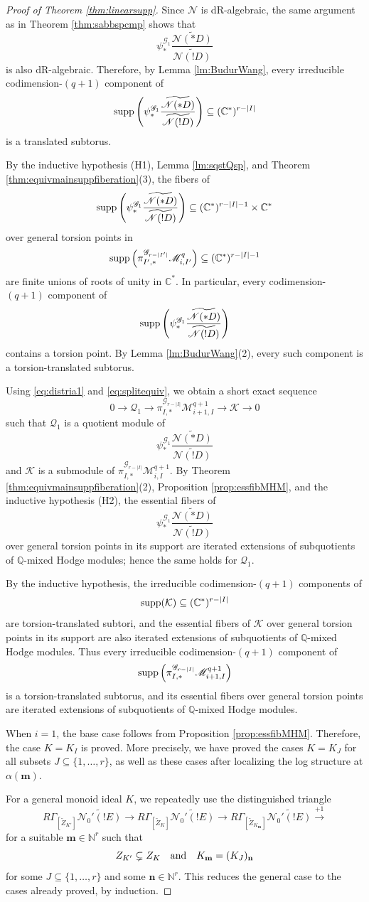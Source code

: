 \documentclass{amsart}
\theoremstyle{plain}
\numberwithin{theorem}{section}
\theoremstyle{definition}
\theoremstyle{remark}
\theoremstyle{definition}
\newcommand{\wt}{\widetilde}
\newcommand{\C}{\mathbb{C}} %
\newcommand{\N}{\mathbb{N}}
\newcommand{\Q}{\mathbb{Q}}
\newcommand{\cK}{\mathcal{K}}
\newcommand{\cN}{\mathcal{N}}
\newcommand{\cQ}{\mathcal{Q}}
\newcommand{\bn}{\mathbf{n}}
\newcommand{\bm}{\mathbf{m}}
\newcommand{\sM}{\mathscr{M}}
\newcommand{\sN}{\mathscr{N}}
\newcommand{\sG}{\mathscr{G}}
\newcommand{\supp}{\textup{supp}}
\begin{document}
\begin{proof}[Proof of Theorem \ref{thm:linearsupp}]
Since $\sN$ is dR-algebraic, the same argument as in
Theorem \ref{thm:sabbspcmp} shows that
\[
\psi_*^{\sG_1}
\frac{\wt{\sN(*D)}}{\wt{\sN(!D)}}
\]
is also dR-algebraic. Therefore, by Lemma \ref{lm:BudurWang}, every
irreducible codimension-$(q+1)$ component of
\[
\supp
\left(
\psi_*^{\sG_1}
\frac{\wt{\sN(*D)}}{\wt{\sN(!D)}}
\right)
\subseteq
(\C^*)^{r-|I|}
\]
is a translated subtorus.

By the inductive hypothesis (H1), Lemma \ref{lm:sqstQsp}, and
Theorem \ref{thm:equivmainsuppfiberation}(3), the fibers of
\[
\supp
\left(
\psi_*^{\sG_1}
\frac{\wt{\sN(*D)}}{\wt{\sN(!D)}}
\right)
\subseteq
(\C^*)^{r-|I|-1}\times\C^*
\]
over general torsion points in
\[
\supp
\left(
\pi_{I',*}^{\sG_{r-|I'|}}\sM^q_{i,I'}
\right)
\subseteq
(\C^*)^{r-|I|-1}
\]
are finite unions of roots of unity in $\C^*$. In particular, every
codimension-$(q+1)$ component of
\[
\supp
\left(
\psi_*^{\sG_1}
\frac{\wt{\sN(*D)}}{\wt{\sN(!D)}}
\right)
\]
contains a torsion point. By Lemma \ref{lm:BudurWang}(2), every such component
is a torsion-translated subtorus.

Using \eqref{eq:distria1} and \eqref{eq:splitequiv}, we obtain a short exact
sequence
\[
0\to
\cQ_1
\to
\pi_{I,*}^{\sG_{r-|I|}}\sM^{q+1}_{i+1,I}
\to
\cK
\to 0
\]
such that $\cQ_1$ is a quotient module of
\[
\psi_*^{\sG_1}
\frac{\wt{\sN(*D)}}{\wt{\sN(!D)}}
\]
and $\cK$ is a submodule of
$\pi_{I,*}^{\sG_{r-|I|}}\sM^{q+1}_{i,I}.$
By Theorem \ref{thm:equivmainsuppfiberation}(2), Proposition
\ref{prop:essfibMHM}, and the inductive hypothesis (H2), the essential fibers
of
\[
\psi_*^{\sG_1}
\frac{\wt{\sN(*D)}}{\wt{\sN(!D)}}
\]
over general torsion points in its support are iterated extensions of
subquotients of $\Q$-mixed Hodge modules; hence the same holds for $\cQ_1$.

By the inductive hypothesis, the irreducible codimension-$(q+1)$ components of
\[
\supp(\cK)\subseteq(\C^*)^{r-|I|}
\]
are torsion-translated subtori, and the essential fibers of $\cK$ over general
torsion points in its support are also iterated extensions of subquotients of
$\Q$-mixed Hodge modules. Thus every irreducible codimension-$(q+1)$ component
of
\[
\supp
\left(
\pi_{I,*}^{\sG_{r-|I|}}\sM^{q+1}_{i+1,I}
\right)
\]
is a torsion-translated subtorus, and its essential fibers over general
torsion points are iterated extensions of subquotients of $\Q$-mixed Hodge
modules.

When $i=1$, the base case follows from Proposition \ref{prop:essfibMHM}.
Therefore, the case $K=K_I$ is proved. More precisely, we have proved the
cases $K=K_J$ for all subsets $J\subseteq\{1,\dots,r\}$, as well as these
cases after localizing the log structure at $\alpha(\bm)$.

For a general monoid ideal $K$, we repeatedly use the distinguished triangle
\[
R\Gamma_{[\wt Z_{K'}]}\wt{\cN_0'(!E)}
\to
R\Gamma_{[\wt Z_K]}\wt{\cN_0'(!E)}
\to
R\Gamma_{[\wt Z_{K_\bm}]}\wt{\cN_0'(!E)}
\xrightarrow{+1}
\]
for a suitable $\bm\in\N^r$ such that
\[
Z_{K'}\subsetneq Z_K
\quad \textup{and} \quad
K_\bm=(K_J)_\bn
\]
for some $J\subseteq\{1,\dots,r\}$ and some $\bn\in\N^r$. This reduces the
general case to the cases already proved, by induction.
\end{proof}
\end{document}
